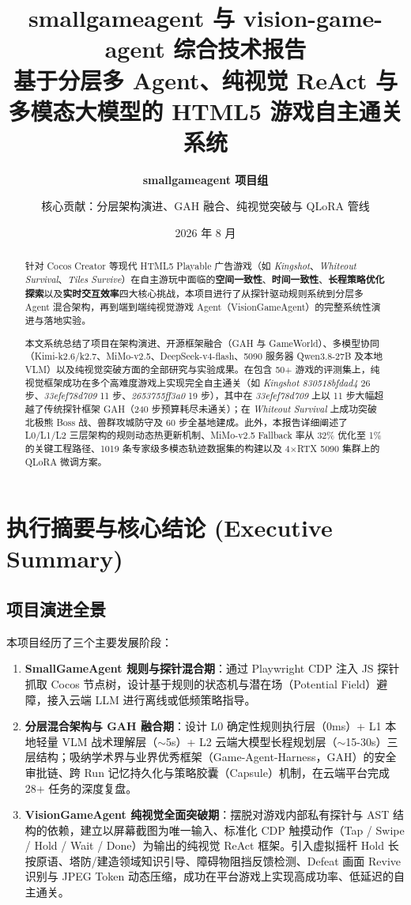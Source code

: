 \documentclass[11pt,a4paper]{ctexart}
\title{\textbf{\huge smallgameagent 与 vision-game-agent 综合技术报告} \\ \Large 基于分层多 Agent、纯视觉 ReAct 与多模态大模型的 HTML5 游戏自主通关系统}
\author{\textbf{smallgameagent 项目组} \and 核心贡献：分层架构演进、GAH 融合、纯视觉突破与 QLoRA 管线}
\date{2026 年 8 月}
\begin{document}
\maketitle

\begin{abstract}
针对 Cocos Creator 等现代 HTML5 Playable 广告游戏（如 \textit{Kingshot}、\textit{Whiteout Survival}、\textit{Tiles Survive}）在自主游玩中面临的\textbf{空间一致性}、\textbf{时间一致性}、\textbf{长程策略优化探索}以及\textbf{实时交互效率}四大核心挑战，本项目进行了从探针驱动规则系统到分层多 Agent 混合架构，再到端到端纯视觉游戏 Agent（VisionGameAgent）的完整系统性演进与落地实验。

本文系统总结了项目在架构演进、开源框架融合（GAH 与 GameWorld）、多模型协同（Kimi-k2.6/k2.7、MiMo-v2.5、DeepSeek-v4-flash、5090 服务器 Qwen3.8-27B 及本地 VLM）以及纯视觉突破方面的全部研究与实验成果。在包含 50+ 游戏的评测集上，纯视觉框架成功在多个高难度游戏上实现完全自主通关（如 \textit{Kingshot 830518bfdad4} 26 步、\textit{33efef78d709} 11 步、\textit{2653755ff3a0} 19 步），其中在 \textit{33efef78d709} 上以 11 步大幅超越了传统探针框架 GAH（240 步预算耗尽未通关）；在 \textit{Whiteout Survival} 上成功突破北极熊 Boss 战、兽群攻城防守及 60 步全基地建成。此外，本报告详细阐述了 L0/L1/L2 三层架构的规则动态热更新机制、MiMo-v2.5 Fallback 率从 32\% 优化至 1\% 的关键工程路径、1019 条专家级多模态轨迹数据集的构建以及 4$\times$RTX 5090 集群上的 QLoRA 微调方案。
\end{abstract}

\tableofcontents
\newpage

\section{执行摘要与核心结论 (Executive Summary)}

\subsection{项目演进全景}
本项目经历了三个主要发展阶段：
\begin{enumerate}[label=\textbf{阶段 \arabic*：},leftmargin=*]
  \item \textbf{SmallGameAgent 规则与探针混合期}：通过 Playwright CDP 注入 JS 探针抓取 Cocos 节点树，设计基于规则的状态机与潜在场（Potential Field）避障，接入云端 LLM 进行离线或低频策略指导。
  \item \textbf{分层混合架构与 GAH 融合期}：设计 L0 确定性规则执行层（0ms）+ L1 本地轻量 VLM 战术理解层（$\sim$5s）+ L2 云端大模型长程规划层（$\sim$15-30s）三层结构；吸纳学术界与业界优秀框架（Game-Agent-Harness，GAH）的安全审批链、跨 Run 记忆持久化与策略胶囊（Capsule）机制，在云端平台完成 28+ 任务的深度复盘。
  \item \textbf{VisionGameAgent 纯视觉全面突破期}：摆脱对游戏内部私有探针与 AST 结构的依赖，建立以屏幕截图为唯一输入、标准化 CDP 触摸动作（Tap / Swipe / Hold / Wait / Done）为输出的纯视觉 ReAct 框架。引入虚拟摇杆 Hold 长按原语、塔防/建造领域知识引导、障碍物阻挡反馈检测、Defeat 画面 Revive 识别与 JPEG Token 动态压缩，成功在平台游戏上实现高成功率、低延迟的自主通关。
\end{enumerate}
\end{document}
